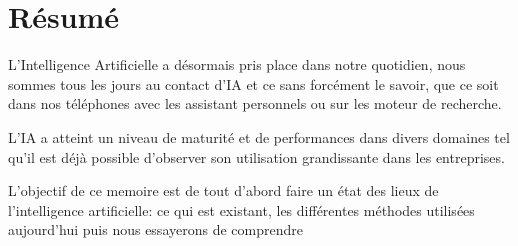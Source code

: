 \chapter{Résumé}
L'Intelligence Artificielle a désormais pris place dans notre quotidien, 
nous sommes tous les jours au contact d'IA et ce sans forcément le savoir, que ce soit dans nos téléphones 
avec les assistant personnels ou sur les moteur de recherche.

L'IA a atteint un niveau de maturité et de performances dans divers domaines tel qu'il est déjà possible 
d'observer son utilisation grandissante dans les entreprises.

L'objectif de ce memoire est de tout d'abord faire un état des 
lieux de l'intelligence artificielle: ce qui est existant, les différentes 
méthodes utilisées aujourd'hui puis nous essayerons de comprendre 

